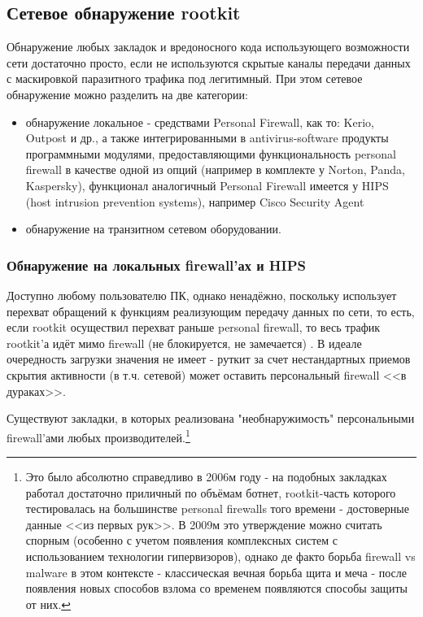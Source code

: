 \subsection{Сетевое обнаружение rootkit}

Обнаружение любых закладок и вредоносного кода использующего возможности сети достаточно
просто, если не используются скрытые каналы передачи данных с маскировкой паразитного
трафика под легитимный. При этом сетевое обнаружение можно разделить на две
категории:\\

\begin{itemize}
\item {обнаружение локальное - средствами  Personal Firewall, как то: Kerio, Outpost и др., а также интегрированными в antivirus-software продукты программными модулями, предоставляющими функциональность personal firewall в качестве одной из опций (например  в комплекте у Norton, Panda, Kaspersky), функционал аналогичный Personal Firewall имеется у HIPS (host intrusion prevention systems), например Cisco Security Agent}
\item{обнаружение на транзитном сетевом оборудовании.}
\end{itemize}


\subsubsection{Обнаружение на локальных firewall'ах и HIPS}

Доступно любому пользователю ПК, однако ненадёжно, поскольку использует
перехват обращений к функциям реализующим передачу данных по сети, то
есть, если rootkit осуществил перехват раньше personal firewall, то
весь трафик rootkit'а идёт мимо firewall (не блокируется, не
замечается) . В идеале очередность загрузки значения не имеет - руткит
за счет нестандартных приемов скрытия активности (в т.ч. сетевой) может
оставить персональный firewall <<в дураках>>.

Существуют закладки, в которых реализована "необнаружимость"
персональными firewall'ами любых производителей.\footnote{Это было абсолютно
справедливо в 2006м году - на подобных закладках работал достаточно приличный по
объёмам ботнет, rootkit-часть которого тестировалась на большинстве personal firewalls
того времени - достоверные данные <<из первых рук>>. В 2009м это утверждение можно
 считать спорным (особенно с учетом появления комплексных систем с использованием
 технологии гипервизоров), однако де факто борьба firewall vs malware в этом
контексте - классическая вечная борьба щита и меча - после появления новых способов
 взлома со временем появляются способы защиты от них.}

